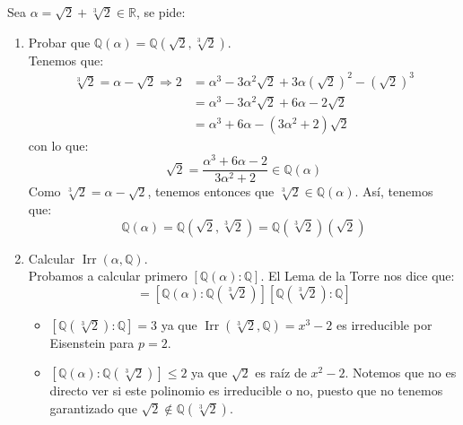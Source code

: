 \documentclass[12pt]{article}
\DeclareMathOperator{\Irr}{Irr}
\begin{document}
    \begin{ejercicio}
    Sea $\alpha = \sqrt{2}+\sqrt[3]{2}\in \mathbb{R}$, se pide:
    \begin{enumerate}[label=\alph*)]
        \item Probar que $\mathbb{Q}(\alpha) = \mathbb{Q}(\sqrt{2},\sqrt[3]{2})$.\\
        
        Tenemos que:
            \begin{align*}
                \sqrt[3]{2} = \alpha - \sqrt{2} \Longrightarrow 2&=\alpha^3 - 3\alpha^2\sqrt{2} + 3\alpha{(\sqrt{2})}^{2} - {(\sqrt{2})}^{3} \\
                                                &=\alpha^3 - 3\alpha^2\sqrt{2}+6\alpha - 2\sqrt{2} \\
                                                &=\alpha^3 + 6\alpha-(3\alpha^2 +2)\sqrt{2}
            \end{align*}
            con lo que:
            \begin{equation*}
                \sqrt{2} = \dfrac{\alpha^3 + 6\alpha - 2}{3\alpha^2 + 2}\in \mathbb{Q}(\alpha)
            \end{equation*}
            Como $\sqrt[3]{2} = \alpha-\sqrt{2}$, tenemos entonces que $\sqrt[3]{2}\in \mathbb{Q}(\alpha)$. Así, tenemos que:
            \begin{equation*}
                \mathbb{Q}(\alpha) = \mathbb{Q}(\sqrt{2},\sqrt[3]{2}) = \mathbb{Q}(\sqrt[3]{2})(\sqrt{2})
            \end{equation*}
        \item Calcular $\Irr(\alpha,\mathbb{Q})$.\\
        
        Probamos a calcular primero $[\mathbb{Q}(\alpha):\mathbb{Q}]$. El Lema de la Torre nos dice que:
            \begin{equation*}
                [\mathbb{Q}(\alpha):\mathbb{Q}] = [\mathbb{Q}(\alpha):\mathbb{Q}(\sqrt[3]{2})][\mathbb{Q}(\sqrt[3]{2}):\mathbb{Q}]
            \end{equation*}
            \begin{itemize}
                \item $[\mathbb{Q}(\sqrt[3]{2}):\mathbb{Q}] = 3$ ya que $\Irr(\sqrt[3]{2},\mathbb{Q}) = x^3-2$ es irreducible por Eisenstein para $p=2$.
                \item $[\mathbb{Q}(\alpha):\mathbb{Q}(\sqrt[3]{2})] \leq 2$ ya que $\sqrt{2}$ es raíz de $x^2-2$. Notemos que no es directo ver si este polinomio es irreducible o no, puesto que no tenemos garantizado que $\sqrt{2}\notin \mathbb{Q}(\sqrt[3]{2})$.
            \end{itemize}


\end{enumerate}
\end{ejercicio}
\end{document}
